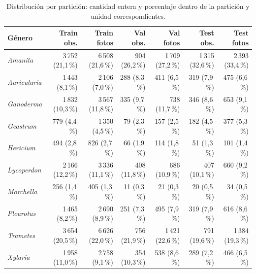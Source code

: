 \begin{table}[H]
\centering
\scriptsize
\caption{Distribución por partición: cantidad entera y porcentaje dentro de la partición y unidad correspondientes.}
\label{tab:distribution}
\begin{tabularx}{\linewidth}{Y r r r r r r}
\toprule
\textbf{Género} & \textbf{Train obs.} & \textbf{Train fotos} & \textbf{Val obs.} & \textbf{Val fotos} & \textbf{Test obs.} & \textbf{Test fotos}\\
\midrule
\textit{Amanita} & 3\,752 (21,1\,\%) & 6\,508 (21,6\,\%) & 904 (26,2\,\%) & 1\,709 (27,2\,\%) & 1\,315 (32,6\,\%) & 2\,393 (33,4\,\%)\\
\textit{Auricularia} & 1\,443 (8,1\,\%) & 2\,106 (7,0\,\%) & 288 (8,3\,\%) & 411 (6,5\,\%) & 319 (7,9\,\%) & 475 (6,6\,\%)\\
\textit{Ganoderma} & 1\,832 (10,3\,\%) & 3\,567 (11,8\,\%) & 335 (9,7\,\%) & 738 (11,7\,\%) & 346 (8,6\,\%) & 653 (9,1\,\%)\\
\textit{Geastrum} & 779 (4,4\,\%) & 1\,350 (4,5\,\%) & 79 (2,3\,\%) & 157 (2,5\,\%) & 182 (4,5\,\%) & 377 (5,3\,\%)\\
\textit{Hericium} & 494 (2,8\,\%) & 826 (2,7\,\%) & 66 (1,9\,\%) & 114 (1,8\,\%) & 51 (1,3\,\%) & 101 (1,4\,\%)\\
\textit{Lycoperdon} & 2\,166 (12,2\,\%) & 3\,336 (11,1\,\%) & 408 (11,8\,\%) & 686 (10,9\,\%) & 407 (10,1\,\%) & 660 (9,2\,\%)\\
\textit{Morchella} & 256 (1,4\,\%) & 405 (1,3\,\%) & 11 (0,3\,\%) & 21 (0,3\,\%) & 20 (0,5\,\%) & 34 (0,5\,\%)\\
\textit{Pleurotus} & 1\,465 (8,2\,\%) & 2\,690 (8,9\,\%) & 251 (7,3\,\%) & 495 (7,9\,\%) & 319 (7,9\,\%) & 616 (8,6\,\%)\\
\textit{Trametes} & 3\,654 (20,5\,\%) & 6\,626 (22,0\,\%) & 756 (21,9\,\%) & 1\,421 (22,6\,\%) & 791 (19,6\,\%) & 1\,384 (19,3\,\%)\\
\textit{Xylaria} & 1\,958 (11,0\,\%) & 2\,758 (9,1\,\%) & 354 (10,3\,\%) & 538 (8,6\,\%) & 289 (7,2\,\%) & 466 (6,5\,\%)\\
\bottomrule
\end{tabularx}
\end{table}
